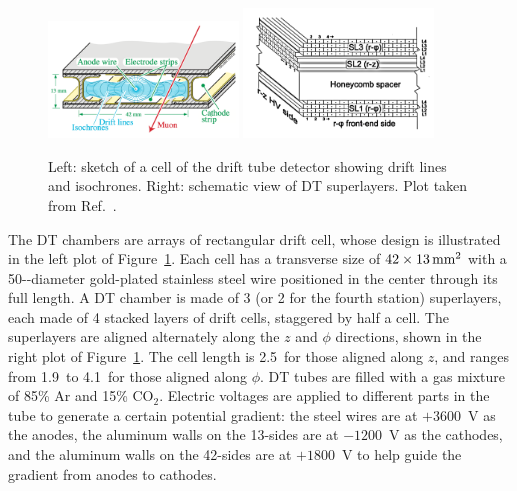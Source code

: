 \begin{figure}[!htb]
    \centering
    \captionsetup{justification=justified}
    \includegraphics[width=0.45\textwidth]{pics/LHC_CMS/DT.png}
    \includegraphics[width=0.45\textwidth]{pics/LHC_CMS/DT_superlayer.png}
    \caption{Left: sketch of a cell of the drift tube detector showing drift lines and isochrones.
             Right: schematic view of DT superlayers.
             Plot taken from Ref.~\cite{collaboration_2013}.}
    \label{fig:cms_dt}
\end{figure}

The DT chambers are arrays of rectangular drift cell, whose design is illustrated in the left plot of Figure~\ref{fig:cms_dt}.
Each cell has a transverse size of $42 \times 13 \,\text{mm}^{2}$ with a 50-\mum-diameter 
gold-plated stainless steel wire positioned in the center through its full length.
A DT chamber is made of 3 (or 2 for the fourth station) superlayers, each made of 4 stacked layers of drift cells, staggered by half a cell.
The superlayers are aligned alternately along the $z$ and $\phi$ directions, shown in the right plot of Figure~\ref{fig:cms_dt}.
The cell length is 2.5~\meter for those aligned along $z$, and ranges from 1.9~\meter to 4.1~\meter for those aligned along $\phi$.
DT tubes are filled with a gas mixture of 85\% Ar and 15\% $\text{CO}_{2}$.
Electric voltages are applied to different parts in the tube to generate a certain potential gradient:
the steel wires are at $+3600$~V as the anodes, the aluminum walls on the 13-\mm sides are at $-1200$~V as the cathodes,
and the aluminum walls on the 42-\mm sides are at $+1800$~V to help guide the gradient from anodes to cathodes.

